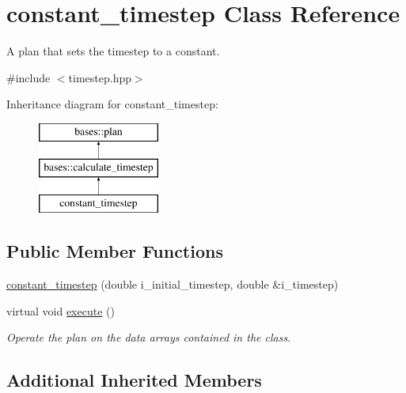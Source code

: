 \hypertarget{classconstant__timestep}{\section{constant\-\_\-timestep Class Reference}
\label{classconstant__timestep}
}


A plan that sets the timestep to a constant.  




{\ttfamily \#include $<$timestep.\-hpp$>$}

Inheritance diagram for constant\-\_\-timestep\-:\begin{figure}[H]
\begin{center}
\leavevmode
\includegraphics[height=3.000000cm]{classconstant__timestep}
\end{center}
\end{figure}
\subsection*{Public Member Functions}
\begin{DoxyCompactItemize}
\item 
\hyperlink{classconstant__timestep_a36545814d3e8ec75516ecc30b41fd5d9}{constant\-\_\-timestep} (double i\-\_\-initial\-\_\-timestep, double \&i\-\_\-timestep)
\begin{DoxyCompactList}\small\item\em \end{DoxyCompactList}\item 
virtual void \hyperlink{classconstant__timestep_ac7a3c79864924c073831feeebe2f0aad}{execute} ()
\begin{DoxyCompactList}\small\item\em Operate the plan on the data arrays contained in the class. \end{DoxyCompactList}\end{DoxyCompactItemize}
\subsection*{Additional Inherited Members}


